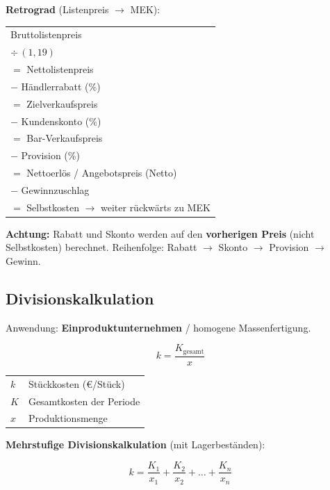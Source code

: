 \documentclass[10pt,a4paper]{article}
\begin{document}
\begin{multicols}{2}
\textbf{Retrograd} (Listenpreis $\to$ MEK):
\begin{formelbox}
\renewcommand{\arraystretch}{1.05}
\begin{tabular}{@{}l@{}}
Bruttolistenpreis \\
$\div\,(1{,}19)$ \\
$=$ Nettolistenpreis \\
$-$ Händlerrabatt (\%) \\
$=$ Zielverkaufspreis \\
$-$ Kundenskonto (\%) \\
$=$ Bar-Verkaufspreis \\
$-$ Provision (\%) \\
$=$ Nettoerlös / Angebotspreis (Netto) \\
$-$ Gewinnzuschlag \\
$=$ Selbstkosten $\to$ weiter rückwärts zu MEK \\
\end{tabular}
\end{formelbox}

\begin{hinweisbox}
\textbf{Achtung:} Rabatt und Skonto werden auf den \textbf{vorherigen Preis} (nicht Selbstkosten) berechnet. Reihenfolge: Rabatt $\to$ Skonto $\to$ Provision $\to$ Gewinn.
\end{hinweisbox}

\columnbreak

\subsection{Divisionskalkulation}

Anwendung: \textbf{Einproduktunternehmen} / homogene Massenfertigung.

\begin{formelbox}
\[
k = \frac{K_{\text{gesamt}}}{x}
\]
\end{formelbox}

\begin{tabular}{|L{1.5cm}|L{5.5cm}|}
\hline $k$ & Stückkosten (€/Stück) \\
$K$ & Gesamtkosten der Periode \\
$x$ & Produktionsmenge \\
\hline
\end{tabular}

\vspace{4pt}
\textbf{Mehrstufige Divisionskalkulation} (mit Lagerbeständen):
\begin{formelbox}
\[
k = \frac{K_1}{x_1} + \frac{K_2}{x_2} + \ldots + \frac{K_n}{x_n}
\]
\end{formelbox}


\end{multicols}
\end{document}
